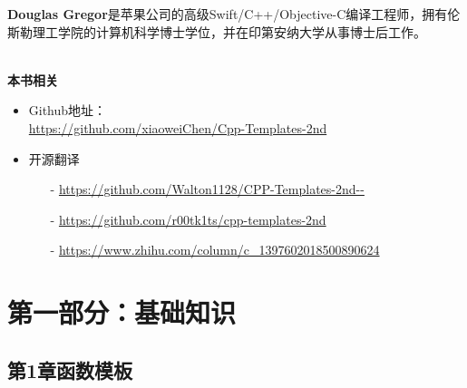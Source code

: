 \documentclass[11pt,a4paper,UTF8]{book}
\begin{document}
\begin{sloppypar}
	\textbf{Douglas Gregor}是苹果公司的高级Swift/C++/Objective-C编译工程师，拥有伦斯勒理工学院的计算机科学博士学位，并在印第安纳大学从事博士后工作。
	
	\hspace*{\fill} \\ %
	\noindent\textbf{本书相关}
	\begin{itemize}
		\item Github地址：\\\url{https://github.com/xiaoweiChen/Cpp-Templates-2nd}
		\item 开源翻译
		\begin{itemize}
			\item[-]
			\url{https://github.com/Walton1128/CPP-Templates-2nd--}
			\item[-]
			\url{https://github.com/r00tk1ts/cpp-templates-2nd}
			\item[-]
			\url{https://www.zhihu.com/column/c_1397602018500890624}
		\end{itemize}
	\end{itemize}
	\newpage
	
	\pagestyle{empty}
	
	\newpage
	
	\pagestyle{empty}
	
	\newpage
	
	\pagestyle{empty}
	
	\newpage
	
	\pagestyle{empty}
	
	\newpage
	
	\tableofcontents
	\newpage

	
	\color{white}
	\section*{第一部分：基础知识}
	\pagecolor{mygray}
	\textbf{}
	\newpage
	\color{black}
	\pagecolor{white}

	\subsection*{ 第1章\hspace{0.5cm}函数模板}
	
	

\end{sloppypar}
\end{document}
